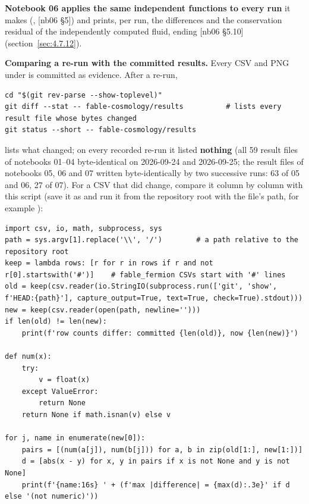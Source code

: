 \textbf{Notebook 06 applies the same independent functions to every run} it makes (,  [nb06 \S{}5]) and prints, per run, the differences and the conservation residual of the independently computed fluid, ending  [nb06 \S{}5.10] (section~\ref{sec:4.7.12}).

\textbf{Comparing a re-run with the committed results.} Every CSV and PNG under  is committed as evidence. After a re-run,

\begin{Verbatim}
cd "$(git rev-parse --show-toplevel)"
git diff --stat -- fable-cosmology/results          # lists every result file whose bytes changed
git status --short -- fable-cosmology/results
\end{Verbatim}

lists what changed; on every recorded re-run it listed \textbf{nothing} (all 59 result files of notebooks 01--04 byte-identical on 2026-09-24 and 2026-09-25; the result files of notebooks 05, 06 and 07 written byte-identically by two successive runs: 63 of 05 and 06, 27 of 07). For a CSV that did change, compare it column by column with this script (save it as  and run it from the repository root with the file's path, for example ):

\begin{Verbatim}
import csv, io, math, subprocess, sys
path = sys.argv[1].replace('\\', '/')        # a path relative to the repository root
keep = lambda rows: [r for r in rows if r and not r[0].startswith('#')]    # fable_fermion CSVs start with '#' lines
old = keep(csv.reader(io.StringIO(subprocess.run(['git', 'show', f'HEAD:{path}'], capture_output=True, text=True, check=True).stdout)))
new = keep(csv.reader(open(path, newline='')))
if len(old) != len(new):
    print(f'row counts differ: committed {len(old)}, now {len(new)}')

def num(x):
    try:
        v = float(x)
    except ValueError:
        return None
    return None if math.isnan(v) else v

for j, name in enumerate(new[0]):
    pairs = [(num(a[j]), num(b[j])) for a, b in zip(old[1:], new[1:])]
    d = [abs(x - y) for x, y in pairs if x is not None and y is not None]
    print(f'{name:16s} ' + (f'max |difference| = {max(d):.3e}' if d else '(not numeric)'))
\end{Verbatim}

